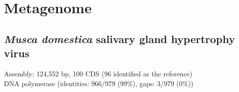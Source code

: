 \section{Metagenome}

\subsection{\textit{Musca domestica} salivary gland hypertrophy virus}
\begin{frame}
Assembly: 124,552 bp, 100 CDS (96 identified as the reference)\\
DNA polymerase (identities: 966/979 (99\%), gaps: 3/979 (0\%))\\

\end{frame}
